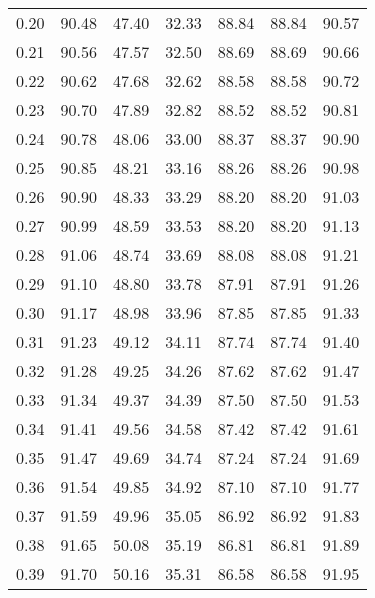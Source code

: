 \begin{tabular}{|c|c|c|c|c|c|c|}
      0.20 &     90.48 &     47.40 &      32.33 &   88.84 &      88.84 &         90.57 \\
      0.21 &     90.56 &     47.57 &      32.50 &   88.69 &      88.69 &         90.66 \\
      0.22 &     90.62 &     47.68 &      32.62 &   88.58 &      88.58 &         90.72 \\
      0.23 &     90.70 &     47.89 &      32.82 &   88.52 &      88.52 &         90.81 \\
      0.24 &     90.78 &     48.06 &      33.00 &   88.37 &      88.37 &         90.90 \\
      0.25 &     90.85 &     48.21 &      33.16 &   88.26 &      88.26 &         90.98 \\
      0.26 &     90.90 &     48.33 &      33.29 &   88.20 &      88.20 &         91.03 \\
      0.27 &     90.99 &     48.59 &      33.53 &   88.20 &      88.20 &         91.13 \\
      0.28 &     91.06 &     48.74 &      33.69 &   88.08 &      88.08 &         91.21 \\
      0.29 &     91.10 &     48.80 &      33.78 &   87.91 &      87.91 &         91.26 \\
      0.30 &     91.17 &     48.98 &      33.96 &   87.85 &      87.85 &         91.33 \\
      0.31 &     91.23 &     49.12 &      34.11 &   87.74 &      87.74 &         91.40 \\
      0.32 &     91.28 &     49.25 &      34.26 &   87.62 &      87.62 &         91.47 \\
      0.33 &     91.34 &     49.37 &      34.39 &   87.50 &      87.50 &         91.53 \\
      0.34 &     91.41 &     49.56 &      34.58 &   87.42 &      87.42 &         91.61 \\
      0.35 &     91.47 &     49.69 &      34.74 &   87.24 &      87.24 &         91.69 \\
      0.36 &     91.54 &     49.85 &      34.92 &   87.10 &      87.10 &         91.77 \\
      0.37 &     91.59 &     49.96 &      35.05 &   86.92 &      86.92 &         91.83 \\
      0.38 &     91.65 &     50.08 &      35.19 &   86.81 &      86.81 &         91.89 \\
      0.39 &     91.70 &     50.16 &      35.31 &   86.58 &      86.58 &         91.95 \\

\end{tabular}
